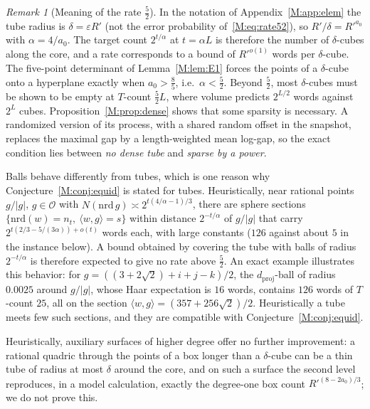 \documentclass[aps,prx,twocolumn,superscriptaddress,nofootinbib,longbibliography]{revtex4-2}
\theoremstyle{plain}
\theoremstyle{definition}
\theoremstyle{remark}
\newtheorem{remark}{Remark}
\newcommand{\dproj}{d_{\mathrm{proj}}}
\begin{document}
\begin{remark}[Meaning of the rate $\tfrac52$]\label{rem:what52}
In the notation of Appendix~\ref{M:app:elem} the tube radius is $\delta=\varepsilon R'$ (not the error probability of~\eqref{M:eq:rate52}), so $R'/\delta=R'^{a_0}$ with $\alpha=4/a_0$. The target count $2^{t/\alpha}$ at $t=\alpha L$ is therefore the number of $\delta$-cubes along the core, and a rate corresponds to a bound of $R'^{o(1)}$ words per $\delta$-cube. The five-point determinant of Lemma~\ref{M:lem:E1} forces the points of a $\delta$-cube onto a hyperplane exactly when $a_0>\tfrac85$, i.e.\ $\alpha<\tfrac52$. Beyond $\tfrac52$, most $\delta$-cubes must be shown to be empty at $T$-count $\tfrac52L$, where volume predicts $2^{L/2}$ words against $2^L$ cubes. Proposition~\ref{M:prop:dense} shows that some sparsity is necessary. A randomized version of its process, with a shared random offset in the snapshot, replaces the maximal gap by a length-weighted mean log-gap, so the exact condition lies between \emph{no dense tube} and \emph{sparse by a power}.

Balls behave differently from tubes, which is one reason why Conjecture~\ref{M:conj:equid} is stated for tubes. Heuristically, near rational points $g/|g|$, $g\in\mathcal O$ with $N(\mathrm{nrd}\,g)\asymp2^{t(4/\alpha-1)/3}$, there are sphere sections $\{\mathrm{nrd}(w)=n_t,\ \langle w,g\rangle=s\}$ within distance $2^{-t/\alpha}$ of $g/|g|$ that carry $2^{t(2/3-5/(3\alpha))+o(t)}$ words each, with large constants ($126$ against about $5$ in the instance below). A bound obtained by covering the tube with balls of radius $2^{-t/\alpha}$ is therefore expected to give no rate above $\tfrac52$. An exact example illustrates this behavior: for $g=((3+2\sqrt2)+i+j-k)/2$, the $\dproj$-ball of radius $0.0025$ around $g/|g|$, whose Haar expectation is $16$ words, contains $126$ words of $T$-count $25$, all on the section $\langle w,g\rangle=(357+256\sqrt2)/2$. Heuristically a tube meets few such sections, and they are compatible with Conjecture~\ref{M:conj:equid}.

Heuristically, auxiliary surfaces of higher degree offer no further improvement: a rational quadric through the points of a box longer than a $\delta$-cube can be a thin tube of radius at most $\delta$ around the core, and on such a surface the second level reproduces, in a model calculation, exactly the degree-one box count $R'^{(8-2a_0)/3}$; we do not prove this.
\end{remark}
\end{document}
